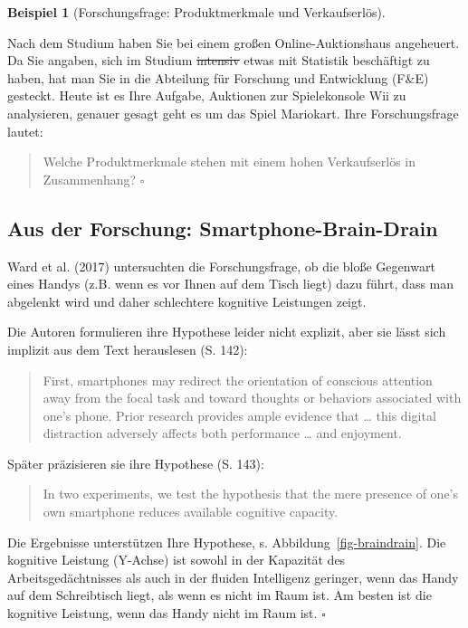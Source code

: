 \documentclass[
  letterpaper,
  twoside,
  open=any]{scrbook}
\theoremstyle{definition}
\theoremstyle{definition}
\newtheorem{example}{Beispiel}[chapter]
\theoremstyle{definition}
\theoremstyle{remark}
\begin{document}
\begin{example}[Forschungsfrage: Produktmerkmale und
Verkaufserlös]\protect\hypertarget{exm-fofrage2}{}\label{exm-fofrage2}

Nach dem Studium haben Sie bei einem großen Online-Auktionshaus
angeheuert. Da Sie angaben, sich im Studium \st{intensiv} etwas mit
Statistik beschäftigt zu haben, hat man Sie in die Abteilung für
Forschung und Entwicklung (F\&E) gesteckt. Heute ist es Ihre Aufgabe,
Auktionen zur Spielekonsole Wii zu analysieren, genauer gesagt geht es
um das Spiel Mariokart. Ihre Forschungsfrage lautet:

\begin{quote}
Welche Produktmerkmale stehen mit einem hohen Verkaufserlös in
Zusammenhang? \(\square\)
\end{quote}

\end{example}

\subsection{Aus der Forschung:
Smartphone-Brain-Drain}\label{aus-der-forschung-smartphone-brain-drain-1}

Ward et al. (2017) untersuchten die Forschungsfrage, ob die bloße
Gegenwart eines Handys (z.B. wenn es vor Ihnen auf dem Tisch liegt) dazu
führt, dass man abgelenkt wird und daher schlechtere kognitive
Leistungen zeigt.

Die Autoren formulieren ihre Hypothese leider nicht explizit, aber sie
lässt sich implizit aus dem Text herauslesen (S. 142):

\begin{quote}
First, smartphones may redirect the orientation of conscious attention
away from the focal task and toward thoughts or behaviors associated
with one's phone. Prior research provides ample evidence that \ldots{}
this digital distraction adversely affects both performance \ldots{} and
enjoyment.
\end{quote}

Später präzisieren sie ihre Hypothese (S. 143):

\begin{quote}
In two experiments, we test the hypothesis that the mere presence of
one's own smartphone reduces available cognitive capacity.
\end{quote}

Die Ergebnisse unterstützen Ihre Hypothese, s.
Abbildung~\ref{fig-braindrain}. Die kognitive Leistung (Y-Achse) ist
sowohl in der Kapazität des Arbeitsgedächtnisses als auch in der fluiden
Intelligenz geringer, wenn das Handy auf dem Schreibtisch liegt, als
wenn es nicht im Raum ist. Am besten ist die kognitive Leistung, wenn
das Handy nicht im Raum ist. \(\square\)
\end{document}
